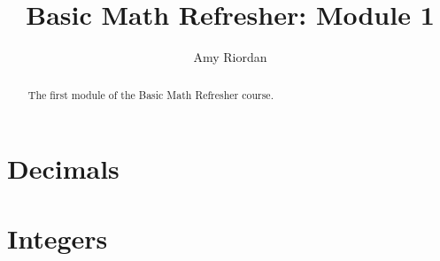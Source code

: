 \documentclass{xourse}
\title{Basic Math Refresher: Module 1}
\author{Amy Riordan}
\begin{document}
\begin{abstract}
    The first module of the Basic Math Refresher course.
\end{abstract}
\maketitle

\part{Decimals}


\part{Integers}

\end{document}
